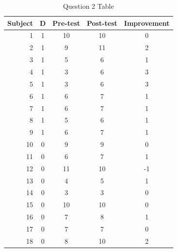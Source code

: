 \documentclass[11pt,notitlepage]{article}\usepackage[]{graphicx}\usepackage[]{color}
\begin{document}
\begin{table}[H]
  \centering
  \caption{Question 2 Table}
    \begin{tabular}{rcccc}
    \toprule
    Subject & D     & Pre-test & Post-test & Improvement \\
    \midrule
    1     & 1     & 10    & 10    & 0 \\
    2     & 1     & 9     & 11    & 2 \\
    3     & 1     & 5     & 6     & 1 \\
    4     & 1     & 3     & 6     & 3 \\
    5     & 1     & 3     & 6     & 3 \\
    6     & 1     & 6     & 7     & 1 \\
    7     & 1     & 6     & 7     & 1 \\
    8     & 1     & 5     & 6     & 1 \\
    9     & 1     & 6     & 7     & 1 \\
    10    & 0     & 9     & 9     & 0 \\
    11    & 0     & 6     & 7     & 1 \\
    12    & 0     & 11    & 10    & -1 \\
    13    & 0     & 4     & 5     & 1 \\
    14    & 0     & 3     & 3     & 0 \\
    15    & 0     & 10    & 10    & 0 \\
    16    & 0     & 7     & 8     & 1 \\
    17    & 0     & 7     & 7     & 0 \\
    18    & 0     & 8     & 10    & 2 \\
    \bottomrule
    \end{tabular}%
  \label{tab:addlabel}%
\end{table}
\end{document}
